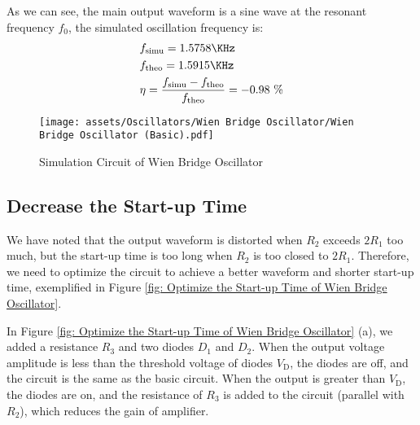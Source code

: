 \documentclass[D:/a_RemoteRepo/GH.LatexNotes/.demo/Analog_Circuits_Handbook.tex]{subfiles}
\begin{document}
\begin{center}
\noindent\begin{minipage}{0.49\columnwidth}
    As we can see, the main output waveform is a sine wave at the resonant frequency $f_0$, the simulated oscillation frequency is:
    \begin{equation}
    \begin{aligned}
        &f_{\text{simu}} = 1.5758 \KHz \\ 
        &f_{\text{theo}} = 1.5915 \KHz \\
        &\eta = \frac{f_{\text{simu}} - f_{\text{theo}}}{f_{\text{theo}}} = -0.98 \ \%
    \end{aligned}
    \end{equation}
\end{minipage}\hfill\begin{minipage}{0.45\columnwidth}
    \begin{figure}[H]\centering
        \texttt{[image: assets/Oscillators/Wien Bridge Oscillator/Wien Bridge Oscillator (Basic).pdf]}
        \caption{Simulation Circuit of Wien Bridge Oscillator}
    \end{figure}
    
\end{minipage}\end{center}





\subsection{Decrease the Start-up Time}
We have noted that the output waveform is distorted when $R_2$ exceeds $2 R_1$ too much, but the start-up time is too long when $R_2$ is too closed to $2 R_1$. Therefore, we need to optimize the circuit to achieve a better waveform and shorter start-up time, exemplified in Figure \ref{fig: Optimize the Start-up Time of Wien Bridge Oscillator}.

In Figure \ref{fig: Optimize the Start-up Time of Wien Bridge Oscillator} (a), we added a resistance $R_3$ and two diodes $D_1$ and $D_2$. 
When the output voltage amplitude is less than the threshold voltage of diodes $V_{\text{D}}$, the diodes are off, and the circuit is the same as the basic circuit. 
When the output is greater than $V_{\text{D}}$, the diodes are on, and the resistance of $R_3$ is added to the circuit (parallel with $R_2$), which reduces the gain of amplifier.
\end{document}
